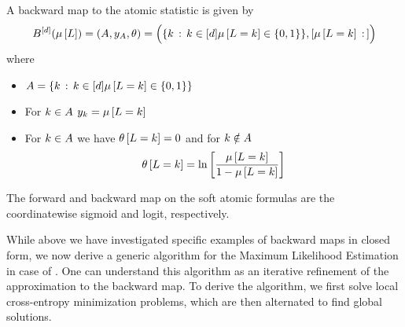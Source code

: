 A backward map to the atomic statistic is given by
\begin{align*}
    B^{[d]}(\mu\left[L\right])
    =(A,y_{A},\theta)
    = \Big(\{k\,:\,k\in[d]\mu\left[L=k\right]\in\{0,1\}\}, [\mu\left[L=k\right]\,:\, ] \Big)
\end{align*}
where
\begin{itemize}
    \item $A = \{k\,:\,k\in[d]\mu\left[L=k\right]\in\{0,1\}\}$
    \item For $k\in A$ $y_{k}=\mu\left[L=k\right]$
    \item For $k\in A$ we have $\theta\left[L=k\right]=0$ and for $k\notin A$
    \begin{align*} %
        \canparamat{\selvariable=\atomenumerator}
        = \lnof{\frac{\meanparamat{\selvariable=\atomenumerator}}{1-\meanparamat{\selvariable=\atomenumerator}}}
    \end{align*}
\end{itemize}

The forward and backward map on the soft atomic formulas are the coordinatewise sigmoid and logit, respectively.




\label{sec:alternatingParEstMLN}

While above we have investigated specific examples of backward maps in closed form, we now derive a generic algorithm for the Maximum Likelihood Estimation in case of \HybridLogicNetworks{}.
One can understand this algorithm as an iterative refinement of the approximation to the backward map.
To derive the algorithm, we first solve local cross-entropy minimization problems, which are then alternated to find global solutions.

